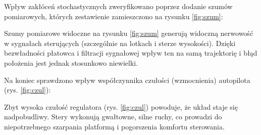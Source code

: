 \akapit Wpływ zakłóceń stochastycznych zweryfikowano poprzez dodanie szumów pomiarowych, których zestawienie zamieszczono na rysunku \ref{fig:szum}:


\akapit Szumy pomiarowe widoczne na rysunku \ref{fig:szum} generują widoczną nerwowość w sygnałach sterujących (szczególnie na lotkach i sterze wysokości). Dzięki bezwładności płatowca i filtracji sygnałowej wpływ ten na samą trajektorię i błąd położenia jest jednak stosunkowo niewielki.

\akapit Na koniec sprawdzono wpływ współczynnika czułości (wzmocnienia) autopilota (rys. \ref{fig:czul}):


\akapit Zbyt wysoka czułość regulatora (rys. \ref{fig:czul}) powoduje, że układ staje się nadpobudliwy. Stery wykonują gwałtowne, silne ruchy, co prowadzi do niepotrzebnego szarpania platformą i pogorszenia komfortu sterowania.
